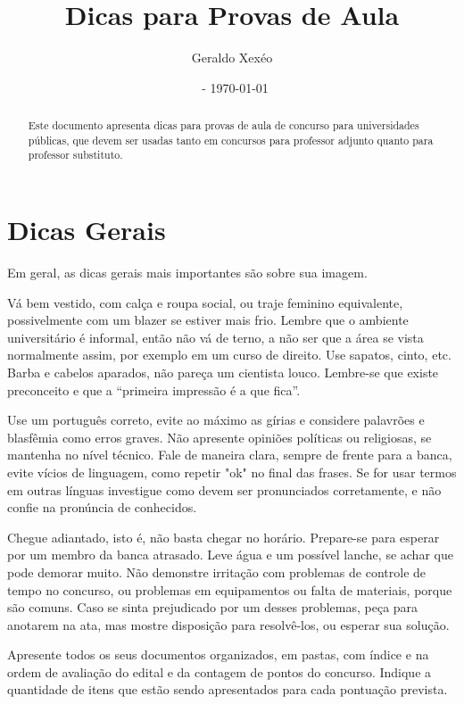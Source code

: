 \documentclass{article}
\title{Dicas para Provas de Aula}
\author{Geraldo Xexéo}
\affil{\url{xexeo@ufrj.br} \\
\url{http://xexeo.net}}
\date{\ccbyncsa\  - \today}
\begin{document}
\maketitle

\begin{abstract}
    Este documento apresenta dicas para provas de aula de concurso para universidades públicas, que devem ser usadas tanto em concursos para professor adjunto quanto para professor substituto.
\end{abstract}

\section{Dicas Gerais}

Em geral, as dicas gerais mais importantes são sobre sua imagem. 

Vá bem vestido, com calça e roupa social, ou traje feminino equivalente, possivelmente com um blazer se estiver mais frio. Lembre que o ambiente universitário é informal, então não vá de terno, a não ser que a área se vista normalmente assim, por exemplo em um curso de direito. Use sapatos, cinto, etc. Barba e cabelos aparados, não pareça um cientista louco. Lembre-se que existe preconceito e que a ``primeira impressão é a que fica''. 

Use um português correto, evite ao máximo as gírias e considere palavrões e blasfêmia como erros graves. Não apresente opiniões políticas ou religiosas, se mantenha no nível técnico. Fale de maneira clara, sempre de frente para a banca, evite vícios de linguagem, como repetir "ok" no final das frases. Se for usar termos em outras línguas investigue como devem ser pronunciados corretamente, e não confie na pronúncia de conhecidos. 

Chegue adiantado, isto é, não basta chegar no horário. Prepare-se para esperar por um membro da banca atrasado. Leve água e um possível lanche, se achar que pode demorar muito. Não demonstre irritação com problemas de controle de tempo no concurso, ou problemas em equipamentos ou falta de materiais, porque são comuns. Caso se sinta prejudicado por um desses problemas, peça para anotarem na ata, mas mostre disposição para resolvê-los, ou esperar sua solução. 

Apresente todos os seus documentos organizados, em pastas, com índice e na ordem de avaliação do edital e da contagem de pontos do concurso. Indique a quantidade de itens que estão sendo apresentados para cada pontuação prevista.  
\end{document}
